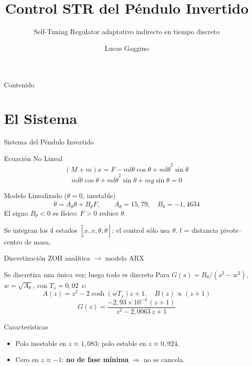 \documentclass{beamer}
\title{Control STR del Péndulo Invertido}
\subtitle{Self-Tuning Regulator adaptativo indirecto en tiempo discreto}
\author{Lucas Gaggino}
\institute{Facultad de Ingeniería - UBA \\ Control Adaptativo 86.20}
\begin{document}
\begin{frame}
\titlepage
\end{frame}

\begin{frame}{Contenido}
\tableofcontents
\end{frame}

\section{El Sistema}

\begin{frame}{Sistema del Péndulo Invertido}
\begin{block}{Ecuación No Lineal}
\[
(M + m)\ddot{x} = F - ml\ddot{\theta}\cos\theta + ml\dot{\theta}^2\sin\theta
\]
\[
ml\ddot{\theta}\cos\theta + ml\dot{\theta}^2\sin\theta + mg\sin\theta = 0
\]
\end{block}
\begin{block}{Modelo Linealizado ($\theta = 0$, inestable)}
\[
\ddot{\theta} = A_\theta\theta + B_\theta F, \qquad
A_\theta = 15{,}79, \quad B_\theta = -1{,}4634
\]
El signo $B_\theta < 0$ es físico: $F>0$ reduce $\theta$.
\end{block}
{\footnotesize Se integran los 4 estados $[x,\dot x,\theta,\dot\theta]$; el
control sólo usa $\theta$. $l$ = distancia pivote--centro de masa.}
\end{frame}

\begin{frame}{Discretización ZOH analítica $\rightarrow$ modelo ARX}
\begin{block}{Se discretiza una única vez; luego todo es discreto}
Para $G(s) = B_\theta/(s^2 - w^2)$, $w = \sqrt{A_\theta}$, con $T_s = 0{,}02$~s:
\[
A(z) = z^2 - 2\cosh(wT_s)z + 1, \quad
B(z) \propto (z+1)
\]
\[
G(z) = \frac{-2{,}93\times10^{-4}\,(z+1)}{z^2 - 2{,}0063\,z + 1}
\]
\end{block}
\begin{block}{Características}
\begin{itemize}
  \item Polo inestable en $z \approx 1{,}083$; polo estable en $z \approx 0{,}924$.
  \item Cero en $z \approx -1$: \textbf{no de fase mínima} $\Rightarrow$ no se cancela.
\end{itemize}
\end{block}
\end{frame}
\end{document}
